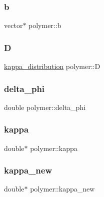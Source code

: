\hypertarget{classpolymer_a5d80f18b440f7d36e1b9c539ab9d64e4}{}\label{classpolymer_a5d80f18b440f7d36e1b9c539ab9d64e4} 
\subsubsection{\texorpdfstring{b}{b}}
{\footnotesize\ttfamily vector$\ast$ polymer\+::b}

\hypertarget{classpolymer_ab766c05cab662491c9378022b58cdda3}{}\label{classpolymer_ab766c05cab662491c9378022b58cdda3} 
\subsubsection{\texorpdfstring{D}{D}}
{\footnotesize\ttfamily \hyperlink{classkappa__distribution}{kappa\+\_\+distribution} polymer\+::D}

\hypertarget{classpolymer_a77bd4d23130573809e2d63f424130665}{}\label{classpolymer_a77bd4d23130573809e2d63f424130665} 
\subsubsection{\texorpdfstring{delta\+\_\+phi}{delta\_phi}}
{\footnotesize\ttfamily double polymer\+::delta\+\_\+phi}

\hypertarget{classpolymer_a1ff7101848ade779f206852df2ce9545}{}\label{classpolymer_a1ff7101848ade779f206852df2ce9545} 
\subsubsection{\texorpdfstring{kappa}{kappa}}
{\footnotesize\ttfamily double$\ast$ polymer\+::kappa}

\hypertarget{classpolymer_abf63b597d52f4549f0f6382e14d71941}{}\label{classpolymer_abf63b597d52f4549f0f6382e14d71941} 
\subsubsection{\texorpdfstring{kappa\+\_\+new}{kappa\_new}}
{\footnotesize\ttfamily double$\ast$ polymer\+::kappa\+\_\+new}

